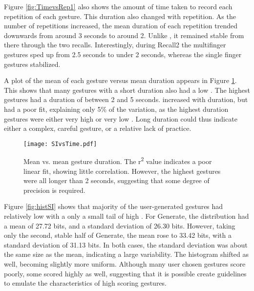 \documentclass{sig-alternate-10pt}
\begin{document}
  
  


Figure \ref{fig:TimevsRep1} also shows the amount of time taken to record each repetition of each gesture. This duration also changed with repetition. As the number of repetitions increased, the mean duration of each repetition trended downwards from around 3 seconds to around 2. Unlike , it remained stable from there through the two recalls. Interestingly, during Recall2 the multifinger gestures sped up from 2.5 seconds to under 2 seconds, whereas the single finger gestures stabilized.
        


 



A plot of the mean   of each gesture versus mean duration appears in Figure \ref{fig:SIvsTime1}. This shows that many gestures with a short duration also had a low  . The highest   gestures had a duration of between 2 and 5 seconds.   increased with duration, but had a poor fit, explaining only 5\% of the variation, as the highest duration gestures were either very high or very low  . Long duration could thus indicate either a complex, careful gesture, or a relative lack of practice.
  
  
  



  
  
  \begin{figure}[!h]
  \centering
  \texttt{[image: SIvsTime.pdf]}
\caption{Mean    vs. mean gesture duration. The r\textsuperscript{2} value indicates a poor linear fit, showing little correlation. However, the highest  gestures were all longer than 2 seconds, suggesting that some degree of precision is required.}
  \label{fig:SIvsTime1}
  \end{figure}
  










Figure \ref{fig:histSI} shows that majority of the user-generated gestures had relatively low  with a only a small tail of high . For Generate, the distribution had a mean of 27.72 bits, and a standard deviation of 26.30 bits. However, taking only the second, stable half of Generate, the mean rose to 33.42 bits, with a standard deviation of 31.13 bits. In both cases, the standard deviation was about the same size as the mean, indicating a large variability. The histogram shifted as well, becoming slightly more uniform. Although many user chosen gestures score poorly, some scored highly as well, suggesting that it is possible create guidelines to emulate the characteristics of high scoring gestures.
\end{document}
